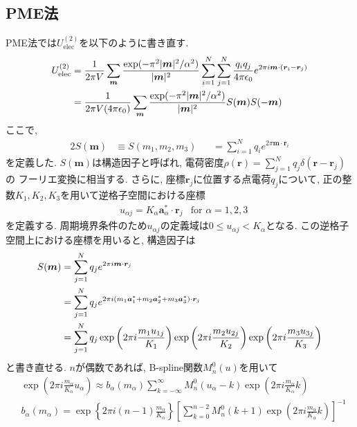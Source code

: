 \subsection{PME法}
PME法では$U_{\mathrm{elec}}^{(2)}$を以下のように書き直す.
\begin{align}
    U_{\mathrm{elec}}^{(2)}
 &=
    \frac{1}{2 \pi V}
    \sum_{\bm{m}} \frac {\exp( -\pi^{2}|\bm{m}|^{2} / \alpha^{2} ) }{|\bm{m}|^{2}}
    \sum_{i=1}^{N}\sum_{j=1}^{N}
    \frac{q_{i} q_{j}}{4 \pi \epsilon_{0}}
    e^{2 \pi i \bm{m} \cdot (\bm{r}_{i} - \bm{r}_{j})}
 \notag
 \\
 &=
    \frac{1}{2 \pi V (4 \pi \epsilon_{0})}
    \sum_{\bm{m}}
    \frac {\exp( -\pi^{2}|\bm{m}|^{2} / \alpha^{2} ) }{|\bm{m}|^{2}}
    S(\bm{m}) S(-\bm{m})
 \label{eq:PME10}
\end{align}
ここで,
\begin{alignat}{2}
     S(\bm{m})
 &\equiv
     S(m_{1},m_{2},m_{3})
 &&=
     \sum_{i=1}^{N} q_{i} e^{2 \pi \bm{m} \cdot \bm{r}_{i}}
 \label{eq:PME12}
\end{alignat}
を定義した. $S(\bm{m})$は構造因子と呼ばれ,
電荷密度$\rho(\bm{r})=\sum_{j=1}^{N}q_{j}\delta(\bm{r}-\bm{r}_{j})$の
フーリエ変換に相当する.
さらに, 座標$\bm{r}_{j}$に位置する点電荷$q_{j}$について, 正の整数$K_{1},K_{2},K_{3}$を用いて逆格子空間における座標
\begin{align}
 &u_{\alpha j} = K_{\alpha} \bm{a}_{\alpha}^{*} \cdot \bm{r}_{j} &\text{for $\alpha=1,2,3$}
 \label{eq:PME13}
\end{align}
を定義する. 周期境界条件のため$u_{\alpha j}$の定義域は$0 \le u_{\alpha j} < K_{\alpha}$となる.
この逆格子空間上における座標を用いると, 構造因子は
\begin{align}
    S(\bm{m})
 &=
    \sum_{j=1}^{N} q_{j} e^{2 \pi i \bm{m} \cdot \bm{r}_{j}}
 \notag
 \\
 &=
    \sum_{j=1}^{N} q_{j}
    e^{2 \pi i (m_{1}\bm{a}_{1}^{*} + m_{2}\bm{a}_{2}^{*} + m_{3}\bm{a}_{3}^{*})
       \cdot \bm{r}_{j}}
 \notag
 \\
 &=
    \sum_{j=1}^{N} q_{j}
    \exp\left(2 \pi i \frac{m_{1} u_{1j}}{K_{1}}\right)
    \exp\left(2 \pi i \frac{m_{2} u_{2j}}{K_{2}}\right)
    \exp\left(2 \pi i \frac{m_{3} u_{3j}}{K_{3}}\right)
 \label{eq:PME14}
\end{align}
と書き直せる.
$n$が偶数であれば, B-spline関数$M_{n}^{0}(u)$を用いて
\begin{align}
 &\exp \left(2 \pi i \frac{m_{\alpha}}{K_{\alpha}} u_{\alpha} \right)
 \approx
     b_{\alpha} (m_{\alpha}) \sum_{k=-\infty}^{\infty} M_{n}^{0}(u_{\alpha} - k )
     \exp \left(2 \pi i \frac{m_{\alpha}}{K_{\alpha}} k \right)
 \label{eq:PME15}
 \\
 &b_{\alpha} (m_{\alpha})
 =
   \exp \left\{2 \pi i (n-1) \frac{m_{\alpha}}{K_{\alpha}} \right\}
   \left[
         \sum_{k=0}^{n-2} M_{n}^{0}(k+1) \exp \left(2 \pi i \frac{m_{\alpha}}{K_{\alpha}} k \right)
    \right]^{-1}
 \label{eq:PME16}
\end{align}
